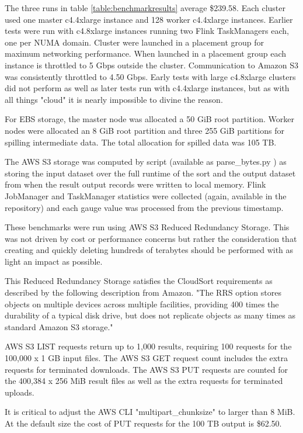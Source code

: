 \documentclass{article}
\begin{document}
The three runs in table \ref{table:benchmarkresults} average \$239.58. Each cluster used one master c4.4xlarge instance and 128 worker c4.4xlarge instances. Earlier tests were run with c4.8xlarge instances running two Flink TaskManagers each, one per NUMA domain. Cluster were launched in a placement group for maximum networking performance. When launched in a placement group each instance is throttled to 5 Gbps outside the cluster. Communication to Amazon S3 was consistently throttled to 4.50 Gbps. Early tests with large c4.8xlarge clusters did not perform as well as later tests run with c4.4xlarge instances, but as with all things "cloud" it is nearly impossible to divine the reason.

For EBS storage, the master node was allocated a 50 GiB root partition. Worker nodes were allocated an 8 GiB root partition and three 255 GiB partitions for spilling intermediate data. The total allocation for spilled data was 105 TB.

The AWS S3 storage was computed by script (available as parse\_bytes.py \cite{flink-cloudsort}) as storing the input dataset over the full runtime of the sort and the output dataset from when the result output records were written to local memory. Flink JobManager and TaskManager statistics were collected (again, available in the repository) and each gauge value was processed from the previous timestamp.

These benchmarks were run using AWS S3 Reduced Redundancy Storage. This was not driven by cost or performance concerns but rather the consideration that creating and quickly deleting hundreds of terabytes should be performed with as light an impact as possible.

This Reduced Redundancy Storage satisfies the CloudSort requirements as described by the following description from Amazon. "The RRS option stores objects on multiple devices across multiple facilities, providing 400 times the durability of a typical disk drive, but does not replicate objects as many times as standard Amazon S3 storage." \cite{awsreducedredundancystorage}

AWS S3 LIST requests return up to 1,000 results, requiring 100 requests for the 100,000 x 1 GB input files. The AWS S3 GET request count includes the extra requests for terminated downloads. The AWS S3 PUT requests are counted for the 400,384 x 256 MiB result files as well as the extra requests for terminated uploads.

It is critical to adjust the AWS CLI "multipart\_chunksize" to larger than 8 MiB. At the default size the cost of PUT requests for the 100 TB output is \$62.50.
\end{document}
